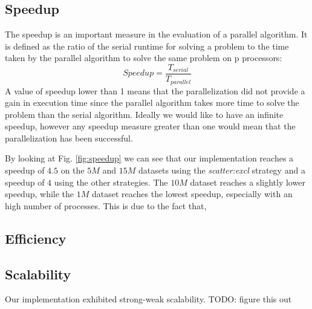 \subsection{Speedup}
The speedup is an important measure in the evaluation of a parallel algorithm.
It is defined as the ratio of the serial runtime for solving a problem to the time taken by the
parallel algorithm to solve the same problem on p processors:
\begin{equation}
    Speedup = \frac{T_{serial}}{T_{parallel}}
\end{equation}
A value of speedup lower than 1 means that the parallelization did not provide a gain in execution time
since the parallel algorithm takes more time to solve the problem than the serial algorithm.
Ideally we would like to have an infinite speedup, however any speedup measure greater than one would
mean that the parallelization has been successful.

By looking at Fig. \ref{fig:speedup} we can see that our implementation reaches a speedup of $4.5$ on the
$5M$ and $15M$ datasets using the \textit{scatter:excl} strategy and a speedup of $4$ using the other strategies.
The $10M$ dataset reaches a slightly lower speedup, while the $1M$ dataset reaches the lowest speedup, especially
with an high number of processes. This is due to the fact that,

\subsection{Efficiency}

\subsection{Scalability}
Our implementation exhibited {strong-weak} scalability. TODO: figure this out

